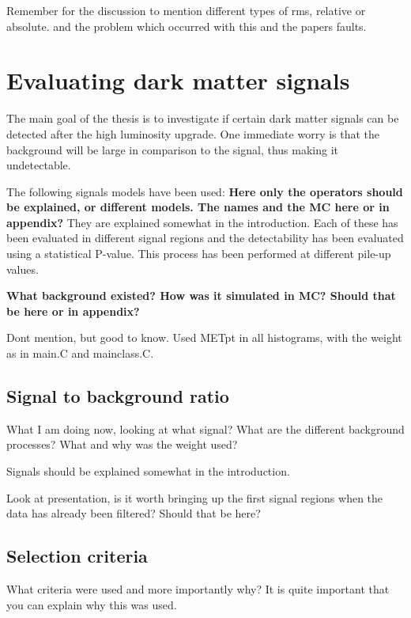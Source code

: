 Remember for the discussion to mention different types of rms, relative or absolute. and the problem which occurred with this and the papers faults.

\section{Evaluating dark matter signals}
The main goal of the thesis is to investigate if certain dark matter signals can be detected after the high luminosity upgrade. One immediate worry is that the background will be large in comparison to the signal, thus making it undetectable. 

The following signals models have been used:
\textbf{Here only the operators should be explained, or different models. The names and the MC here or in appendix?} They are explained somewhat in the introduction.
Each of these has been evaluated in different signal regions and the detectability has been evaluated using a statistical P-value. This process has been performed at different pile-up values. 

\textbf{What background existed? How was it simulated in MC? Should that be here or in appendix?}


Dont mention, but good to know. Used METpt in all histograms, with the weight as in main.C and mainclass.C. 


\subsection{Signal to background ratio}
What I am doing now, looking at what signal? What are the different background processes? What and why was the weight used?

Signals should be explained somewhat in the introduction.



Look at presentation, is it worth bringing up the first signal regions when the data has already been filtered? Should that be here?
 
\subsection{Selection criteria}
What criteria were used and more importantly why? It is quite important that you can explain why this was used.

